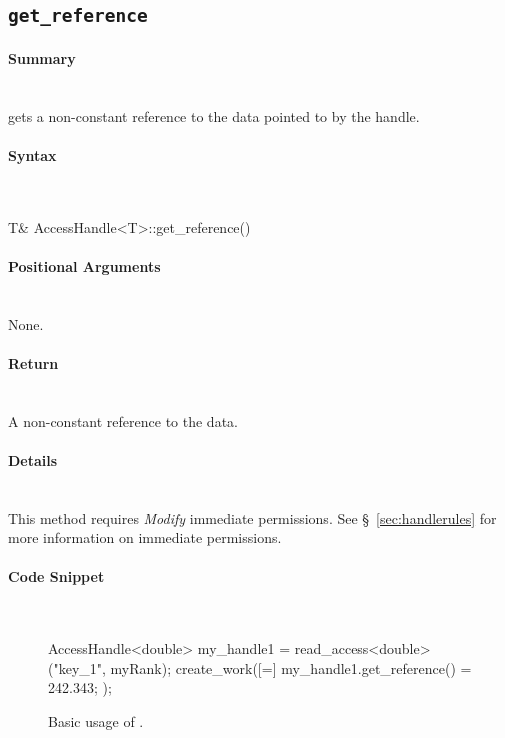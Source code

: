 \subsection{\texttt{get\_reference}}

\paragraph{Summary}\mbox{}\\
 gets a non-constant reference to the data pointed to
by the \gls{handle}.

\paragraph{Syntax}\mbox{}\\
\begin{CppCode}
T& AccessHandle<T>::get_reference()
\end{CppCode}

\paragraph{Positional Arguments}\mbox{}\\
None.

\paragraph{Return}\mbox{}\\
A non-constant reference to the data.  

\paragraph{Details}\mbox{}\\
This method requires {\it Modify} \gls{immediate permissions}.  See
\S~\ref{sec:handlerules} for more information on \gls{immediate permissions}.

\paragraph{Code Snippet}\mbox{}\\
\begin{figure}[!h]
\begin{CppCodeNumb}
AccessHandle<double> my_handle1 = read_access<double>("key_1", myRank);
create_work([=]{
  my_handle1.get_reference() = 242.343;
});
\end{CppCodeNumb}
\label{fig:fe_api_getreference}
\caption{Basic usage of \protect{}.}
\end{figure}


